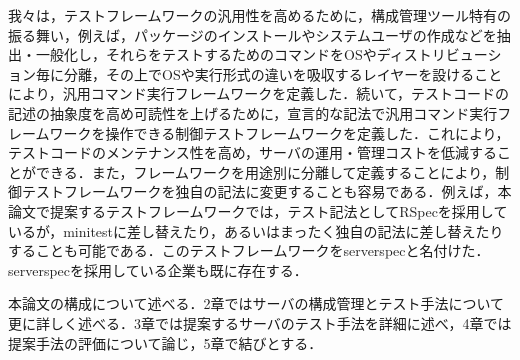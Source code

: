我々は，テストフレームワークの汎用性を高めるために，構成管理ツール特有の振る舞い，例えば，パッケージのインストールやシステムユーザの作成などを抽出・一般化し，それらをテストするためのコマンドをOSやディストリビューション毎に分離，その上でOSや実行形式の違いを吸収するレイヤーを設けることにより，汎用コマンド実行フレームワークを定義した．続いて，テストコードの記述の抽象度を高め可読性を上げるために，宣言的な記法で汎用コマンド実行フレームワークを操作できる制御テストフレームワークを定義した．これにより，テストコードのメンテナンス性を高め，サーバの運用・管理コストを低減することができる．また，フレームワークを用途別に分離して定義することにより，制御テストフレームワークを独自の記法に変更することも容易である．例えば，本論文で提案するテストフレームワークでは，テスト記法としてRSpec\cite{rspec}を採用しているが，minitest\cite{minitest}に差し替えたり，あるいはまったく独自の記法に差し替えたりすることも可能である．このテストフレームワークをserverspec\cite{serverspec}と名付けた．serverspecを採用している企業も既に存在する\cite{nintendo}\cite{wantedly}．

本論文の構成について述べる．2章ではサーバの構成管理とテスト手法について更に詳しく述べる．3章では提案するサーバのテスト手法を詳細に述べ，4章では提案手法の評価について論じ，5章で結びとする．
